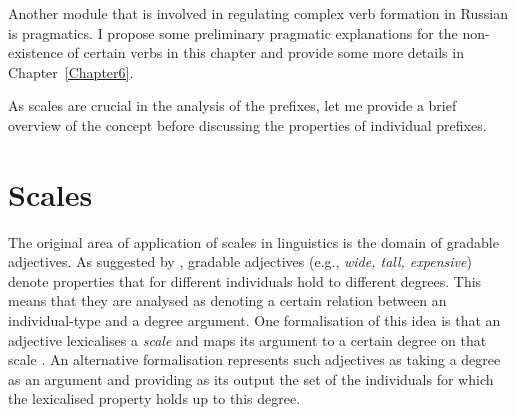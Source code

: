 Another module that is involved in regulating complex verb formation in Russian is pragmatics. I propose some preliminary pragmatic explanations for the non-existence of certain verbs in this chapter and provide some more details in Chapter~\ref{Chapter6}.

As scales are crucial in the analysis of the prefixes, let me provide a brief overview of the concept before discussing the properties of individual prefixes.

\section{Scales}


The original area of application of scales in linguistics is the domain of gradable adjectives. As suggested by \citet{Kennedy:99}, gradable adjectives (e.g., \textit{wide, tall, expensive}) denote properties that for different individuals hold to different degrees. This means that they are analysed as denoting a certain relation between an individual-type and a degree argument. One formalisation of this idea is that an adjective lexicalises a \textit{scale} and maps its argument to a certain degree on that scale \citep{Kennedy:01, KennedyLevin:02}. An alternative formalisation \citep[e.g.,][]{Heim:00} represents such adjectives as taking a degree as an argument and providing as its output the set of the individuals for which the lexicalised property holds up to this degree.

